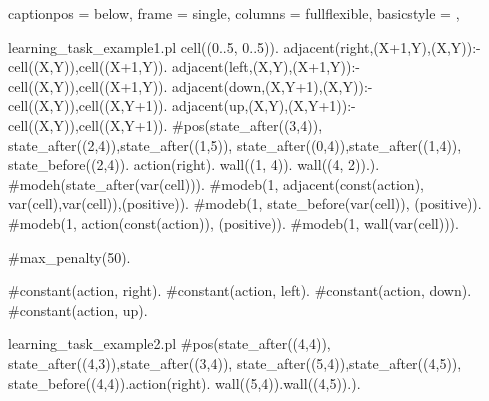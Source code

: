 \lstset
{
  captionpos = below,
  frame      = single,
  columns    = fullflexible,
  basicstyle = \ttfamily,
}

\begin{filecontents*}{learning_task_example1.pl}
cell((0..5, 0..5)).
adjacent(right,(X+1,Y),(X,Y)):-cell((X,Y)),cell((X+1,Y)).
adjacent(left,(X,Y),(X+1,Y)):-cell((X,Y)),cell((X+1,Y)).
adjacent(down,(X,Y+1),(X,Y)):-cell((X,Y)),cell((X,Y+1)).
adjacent(up,(X,Y),(X,Y+1)):- cell((X,Y)),cell((X,Y+1)).
#pos({state_after((3,4))}, 
     {state_after((2,4)),state_after((1,5)),
     state_after((0,4)),state_after((1,4))}, 
     {state_before((2,4)). action(right). 
     wall((1, 4)). wall((4, 2)).}).
#modeh(state_after(var(cell))).
#modeb(1, adjacent(const(action),
          var(cell),var(cell)),(positive)).
#modeb(1, state_before(var(cell)), (positive)).
#modeb(1, action(const(action)), (positive)).
#modeb(1, wall(var(cell))).

#max_penalty(50).

#constant(action, right).
#constant(action, left).
#constant(action, down).
#constant(action, up).
\end{filecontents*}

\begin{filecontents*}{learning_task_example2.pl}
#pos({state_after((4,4))},  %
     {state_after((4,3)),state_after((3,4)),%
     state_after((5,4)),state_after((4,5))}, 
    {state_before((4,4)).action(right). %
    wall((5,4)).wall((4,5)).}).
\end{filecontents*}


